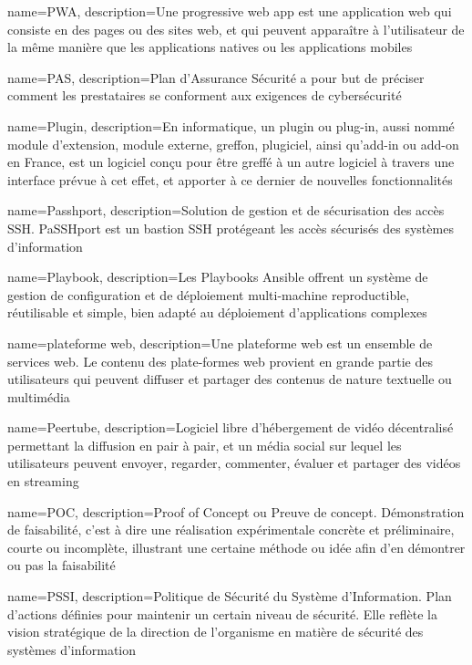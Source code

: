 {
    name=PWA,
    description={Une progressive web app est une application web qui consiste en des pages ou des sites web, et qui peuvent apparaître à l'utilisateur de la même manière que les applications natives ou les applications mobiles}
}

{
    name=PAS,
    description={Plan d'Assurance Sécurité a pour but de préciser comment les prestataires se conforment aux exigences de cybersécurité}
}

{
    name=Plugin,
    description={En informatique, un plugin ou plug-in, aussi nommé module d'extension, module externe, greffon, plugiciel, ainsi qu'add-in ou add-on en France, est un logiciel conçu pour être greffé à un autre logiciel à travers une interface prévue à cet effet, et apporter à ce dernier de nouvelles fonctionnalités}
}

{
    name=Passhport,
    description={Solution de gestion et de sécurisation des accès SSH. PaSSHport est un bastion SSH protégeant les accès sécurisés des systèmes d'information}
}

{
    name=Playbook,
    description={Les Playbooks Ansible offrent un système de gestion de configuration et de déploiement multi-machine reproductible, réutilisable et simple, bien adapté au déploiement d'applications complexes}
}

{
    name=plateforme web,
    description={Une plateforme web est un ensemble de services web. Le contenu des plate-formes web provient en grande partie des utilisateurs qui peuvent diffuser et partager des contenus de nature textuelle ou multimédia}
}

{
    name=Peertube,
    description={Logiciel libre d'hébergement de vidéo décentralisé permettant la diffusion en pair à pair, et un média social sur lequel les utilisateurs peuvent envoyer, regarder, commenter, évaluer et partager des vidéos en streaming}
}

{
    name=POC,
    description={Proof of Concept ou Preuve de concept. Démonstration de faisabilité, c'est à dire une réalisation expérimentale concrète et préliminaire, courte ou incomplète, illustrant une certaine méthode ou idée afin d'en démontrer ou pas la faisabilité}
}

{
    name=PSSI,
    description={Politique de Sécurité du Système d'Information. Plan d'actions définies pour maintenir un certain niveau de sécurité. Elle reflète la vision stratégique de la direction de l'organisme en matière de sécurité des systèmes d'information}
}

